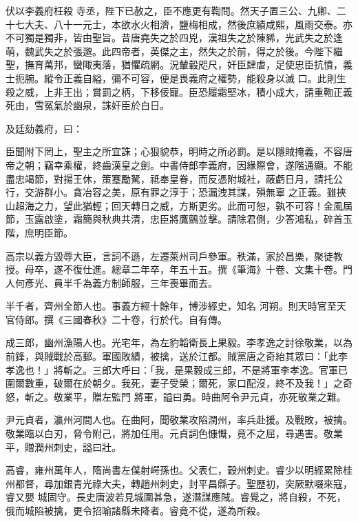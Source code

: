 \begin{pinyinscope}
 伏以李義府枉殺
 寺丞，陛下已赦之，臣不應更有鞫問。然天子置三公、九卿、二十七大夫、八十一元士，本欲水火相濟，鹽梅相成，然後庶績咸熙，風雨交泰。亦不可獨是獨非，皆由聖旨。昔唐堯失之於四兇，漢祖失之於陳豨，光武失之於逢萌，魏武失之於張邈。此四帝者，英傑之主，然失之於前，得之於後。今陛下繼聖，撫育萬邦，蠻陬夷落，猶懼疏網。況輦轂咫尺，奸臣肆虐，足使忠臣抗憤，義士扼腕。縱令正義自縊，彌不可容，便是畏義府之權勢，能殺身以滅
 口。此則生殺之威，上非王出；賞罰之柄，下移佞寵。臣恐履霜堅冰，積小成大，請重鞫正義死由，雪冤氣於幽泉，誅奸臣於白日。



 及廷劾義府，曰：



 臣聞附下罔上，聖主之所宜誅；心狠貌恭，明時之所必罰。是以隱賊掩義，不容唐帝之朝；竊幸乘權，終齒漢皇之劍。中書侍郎李義府，因緣際會，遂階通顯。不能盡忠竭節，對揚王休，策蹇勵駑，祗奉皇眷，而反憑附城社，蔽虧日月，請托公行，交游群小。貪冶容之美，原有罪之淳于；恐漏洩其謀，殞無辜
 之正義。雖挾山超海之力，望此猶輕；回天轉日之威，方斯更劣。此而可恕，孰不可容！金風屆節，玉露啟塗，霜簡與秋典共清，忠臣將鷹鸇並擊。請除君側，少答鴻私，碎首玉階，庶明臣節。



 高宗以義方毀辱大臣，言詞不遜，左遷萊州司戶參軍。秩滿，家於昌樂，聚徒教授。母卒，遂不復仕進。總章二年卒，年五十五。撰《筆海》十卷、文集十卷。門人何彥光、員半千為義方制師服，三年喪畢而去。



 半千者，齊州全節人也。事義方經十餘年，博涉經史，知名
 河朔。則天時官至天官侍郎。撰《三國春秋》二十卷，行於代。自有傳。



 成三郎，幽州漁陽人也。光宅年，為左豹韜衛長上果毅。李孝逸之討徐敬業，以為前鋒，與賊戰於高郵。軍國敗績，被擒，送於江都。賊黨唐之奇紿其眾曰：「此李孝逸也！」將斬之。三郎大呼曰：「我，是果毅成三郎，不是將軍李孝逸。官軍已圍爾數重，破爾在於朝夕。我死，妻子受榮；爾死，家口配沒，終不及我！」之奇怒，斬之。敬業平，贈左監門
 將軍，謚曰勇。時曲阿令尹元貞，亦死敬業之難。



 尹元貞者，瀛州河間人也。在曲阿，聞敬業攻陷潤州，率兵赴援。及戰敗，被擒。敬業臨以白刃，脅令附己，將加任用。元貞詞色慷慨，竟不之屈，尋遇害。敬業平，贈潤州刺史，謚曰壯。



 高睿，雍州萬年人，隋尚書左僕射崿孫也。父表仁，穀州刺史。睿少以明經累除桂州都督，尋加銀青光祿大夫，轉趙州刺史，封平昌縣子。聖歷初，突厥默啜來寇，睿又嬰
 城固守。長史唐波若見城圍甚急，遂潛謀應賊。睿覺之，將自殺，不死，俄而城陷被擒，更令招喻諸縣未降者。睿竟不從，遂為所殺。




\end{pinyinscope}
